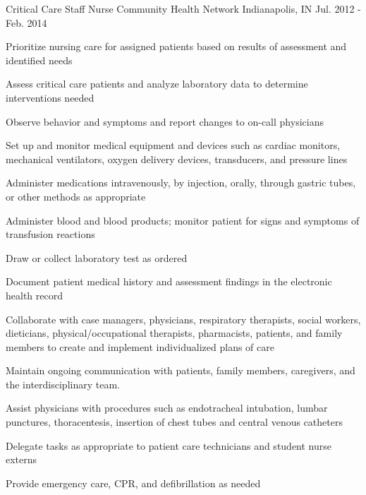 \begin{cventries}
  \cventry
    {Critical Care Staff Nurse} %
    {Community Health Network} %
    {Indianapolis, IN} %
    {Jul. 2012 - Feb. 2014} %
    {
      \begin{cvitems} %
        \item {Prioritize nursing care for assigned patients based on results of assessment and identified needs}
        \item {Assess critical care patients and analyze laboratory data to determine interventions needed}
        \item {Observe behavior and symptoms and report changes to on-call physicians}
        \item {Set up and monitor medical equipment and devices such as cardiac monitors, mechanical ventilators, oxygen delivery devices, transducers, and pressure lines}
        \item {Administer medications intravenously, by injection, orally, through gastric tubes, or other methods as appropriate}
        \item {Administer blood and blood products; monitor patient for signs and symptoms of transfusion reactions}
        \item {Draw or collect laboratory test as ordered}
        \item {Document patient medical history and assessment findings in the electronic health record}
        \item {Collaborate with case managers, physicians, respiratory therapists, social workers, dieticians, physical/occupational therapists, pharmacists, patients, and family members to create and implement individualized plans of care}
        \item {Maintain ongoing communication with patients, family members, caregivers, and the interdisciplinary team.}
        \item {Assist physicians with procedures such as endotracheal intubation, lumbar punctures, thoracentesis, insertion of chest tubes and central venous catheters}
        \item {Delegate tasks as appropriate to patient care technicians and student nurse externs}
        \item {Provide emergency care, CPR, and defibrillation as needed}
      \end{cvitems}
    }


\end{cventries}
